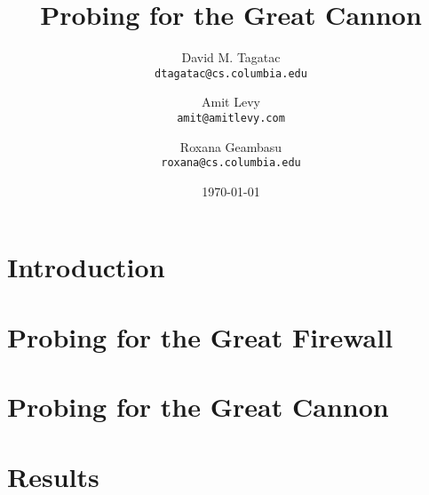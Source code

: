 \documentclass[10pt,twocolumn]{article}
\begin{document}
\title{\bf Probing for the Great Cannon}
\author{
	David M. Tagatac\\
	\texttt{dtagatac@cs.columbia.edu}
	\and
	Amit Levy\\
	\texttt{amit@amitlevy.com}
	\and
	Roxana Geambasu\\
	\texttt{roxana@cs.columbia.edu}
}
\date{\today}
\maketitle
\thispagestyle{empty}

%

\section{Introduction}


\section{Probing for the Great Firewall}


\section{Probing for the Great Cannon}


\section{Results}\label{results}


%

%

{\footnotesize 
}
\end{document}
